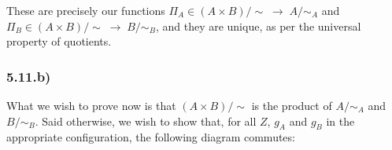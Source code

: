 
These are precisely our functions $\Pi_A \in (A \times B)/\sim \; \to \; A/\sim_A$ and $\Pi_B \in (A \times B)/\sim \; \to \; B/\sim_B$, and they are unique, as per the universal property of quotients.


\subsubsection*{5.11.b)}

What we wish to prove now is that $(A \times B)/\sim$ is the product of $A/\sim_A$ and $B/\sim_B$. Said otherwise, we wish to show that, for all $Z$, $g_A$ and $g_B$ in the appropriate configuration, the following diagram commutes:


